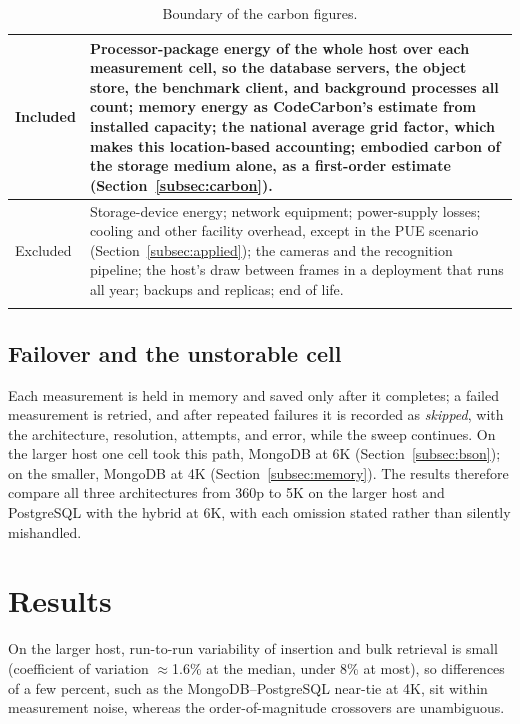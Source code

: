 \documentclass[pdflatex,sn-basic]{sn-jnl}%
\begin{document}
\begin{table}[htbp]
\caption{Boundary of the carbon figures.}\label{tab:boundary}
\small
\begin{tabular}{@{}p{}p{}@{}}
\toprule
Included & Processor-package energy of the whole host over each measurement cell, so the database servers, the object store, the benchmark client, and background processes all count; memory energy as CodeCarbon's estimate from installed capacity; the national average grid factor, which makes this location-based accounting; embodied carbon of the storage medium alone, as a first-order estimate (Section~\ref{subsec:carbon}). \\
\midrule
Excluded & Storage-device energy; network equipment; power-supply losses; cooling and other facility overhead, except in the PUE scenario (Section~\ref{subsec:applied}); the cameras and the recognition pipeline; the host's draw between frames in a deployment that runs all year; backups and replicas; end of life. \\
\botrule
\end{tabular}
\end{table}

\subsection{Failover and the unstorable cell}\label{subsec:failover}
Each measurement is held in memory and saved only after it completes; a failed measurement is retried, and after repeated failures it is recorded as \emph{skipped}, with the architecture, resolution, attempts, and error, while the sweep continues. On the larger host one cell took this path, MongoDB at 6K (Section~\ref{subsec:bson}); on the smaller, MongoDB at 4K (Section~\ref{subsec:memory}). The results therefore compare all three architectures from 360p to 5K on the larger host and PostgreSQL with the hybrid at 6K, with each omission stated rather than silently mishandled.

\section{Results}\label{sec:results}

On the larger host, run-to-run variability of insertion and bulk retrieval is small (coefficient of variation $\approx$1.6\% at the median, under 8\% at most), so differences of a few percent, such as the MongoDB--PostgreSQL near-tie at 4K, sit within measurement noise, whereas the order-of-magnitude crossovers are unambiguous.
\end{document}
